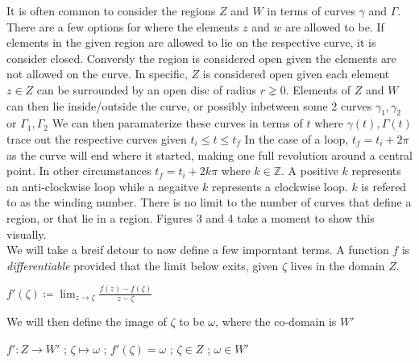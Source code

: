 \documentclass[a4paper,man,natbib]{apa6}
\newcommand{\Z}{\mathbb{Z}}  %
\begin{document}
It is often common to consider the regions $ Z $ and $ W $ in terms of curves $ \gamma $ and $ \Gamma $.
There are a few options for where the elements $ z $ and $ w $ are allowed to be. If elements in the given region are allowed to lie on the respective curve, it is consider closed.
Conversly the region is considered open given the elements are not allowed on the curve. 
In specific, $ Z $ is considered open given each element $ z \in Z $ can be surrounded by an open disc of radius $ r \gneq  0 $.
Elements of $ Z $ and $ W $ can then lie inside/outside the curve, or possibly inbetween some 2 curves  $ \gamma_{1},\gamma_{2} $ or $ \Gamma_{1},\Gamma_{2} $
We can then paramaterize these curves in terms of $ t $ where $ \gamma(t), \Gamma(t) $ trace out the respective curves given $ t_{i} \leq t \leq t_{f} $
In the case of a loop, $ t_{f} = t_{i} + 2\pi $ as the curve will end where it started, making one full revolution around a central point. 
In other circumstances $ t_{f} = t_{i} + 2k\pi $ where $ k \in \Z $. A positive $ k $ represents an anti-clockwise loop while a negaitve $ k $ represents a clockwise loop. 
$ k $ is refered to as the winding number. There is no limit to the number of curves that define a region, or that lie in a region. 
Figures 3 and 4 take a moment to show this visually. 
\\
We will take a breif detour to now define a few imporntant terms. 
A function $ f $ is \textit{differentiable} provided that the limit below exits, given $ \zeta $ lives in the domain $ Z $.

\begin{center}

      $ f'(\zeta) \coloneqq \lim_{z \to \zeta} \frac{f(z) - f(\zeta)}{z - \zeta} $ 

\end{center}

We will then define the image of $ \zeta $ to be $ \omega $, where the co-domain is $ W' $

\begin{center}

      $ f': Z \to W' $ ; $ \zeta \mapsto \omega $ ; $ f'(\zeta) = \omega $ ; $ \zeta \in Z $ ; $ \omega \in W' $

\end{center}
\end{document}
